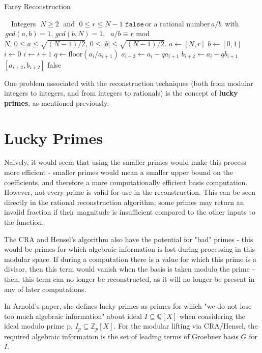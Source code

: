 \documentclass[letterpaper,12pt,titlepage,oneside,final]{book}
\newcommand\abs[1]{\left|#1\right|}
\begin{document}
\begin{algorithm}[H]
\caption{Farey Reconstruction}\label{farey}
\begin{algorithmic}[1]
\Input $\quad$Integers $\; N \geq 2 \;$ and $\; 0 \leq r \leq N - 1$
\Output $\texttt{false} \,$or a rational number$\, a/b \,$ with$\, gcd(a, b) = 1,\, gcd(b, N) = 1,$ $\; a/b \equiv r $ mod $ N, \, 0 \leq a \leq \sqrt{(N-1)/2}, \, 0 \leq \abs{b} \leq \sqrt{(N-1)/2}.$ 
\State $a \gets [ N, r]$
\State $b \gets [ 0, 1]$
\State $i \gets 0$
  \State $i \gets i + 1$
  \State $q \gets \text{floor}( a_i / a_{i+1})$
  \State $a_{i+2} \gets a_i - qa_{i+1}$
  \State $b_{i+2} \gets a_i - qb_{i+1}$
\EndWhile\\  
  \State \quad \Return $[ a_{i+2}, b_{i+2}]$
\Else 
  \State \quad \Return false
\EndIf
\EndProcedure
\end{algorithmic}
\end{algorithm}

One problem associated with the reconstruction techniques (both from modular integers to integers, and from integers to rationals) is the concept of \textbf{lucky primes}, as mentioned previously.    

\section{Lucky Primes}

Naively, it would seem that using the smaller primes would make this process more efficient - smaller primes would mean a smaller upper bound on the coefficients, and therefore a more computationally efficient basis computation.  However, not every prime is valid for use in the reconstruction.  This can be seen directly in the rational reconstruction algorithm; some primes may return an invalid fraction if their magnitude is insufficient compared to the other inputs to the function.  

The CRA and Hensel's algorithm also have the potential for "bad" primes - this would be primes for which algebraic information is lost during processing in this modular space.  If during a computation there is a value for which this prime is a divisor, then this term would vanish when the basis is taken modulo the prime - then, this term can no longer be reconstructed, as it will no longer be present in any of later computations.

In Arnold's paper, she defines lucky primes as primes for which "we do not lose too much algebraic information" about ideal ${I \subseteq \mathbb{Q}[X]}$ when considering the ideal modulo prime p, ${I_p \subseteq \mathbb{Z}_p[X]}$.  For the modular lifting via CRA/Hensel, the required algebraic information is the set of leading terms of Groebner basis ${G}$ for ${I}$.
\end{document}

